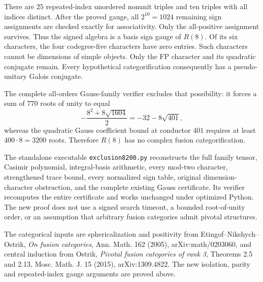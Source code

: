 There are $25$ repeated-index unordered nonunit triples and ten triples
with all indices distinct. After the proved gauge, all $2^{10}=1024$
remaining sign assignments are checked exactly for associativity. Only
the all-positive assignment survives. Thus the signed algebra is a basis
sign gauge of $R(8)$. Of its six characters, the four codegree-five
characters have zero entries. Such characters cannot be dimensions of
simple objects. Only the FP character and its quadratic conjugate remain.
Every hypothetical categorification consequently has a pseudo-unitary
Galois conjugate.

The complete all-orders Gauss-family verifier excludes that possibility:
it forces a sum of $770$ roots of unity to equal
\[
-\frac{8^2+8\sqrt{1604}}2=-32-8\sqrt{401},
\]
whereas the quadratic Gauss coefficient bound at conductor $401$ requires
at least $400\cdot8=3200$ roots. Therefore $R(8)$ has no complex fusion
categorification.

The standalone executable \texttt{exclusion8200.py} reconstructs the
full family tensor, Casimir polynomial, integral-basis arithmetic, every
mod-two character, strengthened trace bound, every normalized sign table,
original dimension-character obstruction, and the complete existing Gauss
certificate. Its verifier recomputes the entire certificate and works
unchanged under optimized Python. The new proof does not use a signed
search timeout, a bounded root-of-unity order, or an assumption that
arbitrary fusion categories admit pivotal structures.

The categorical inputs are sphericalization and positivity from
Etingof--Nikshych--Ostrik, \emph{On fusion categories},
Ann. Math. 162 (2005), arXiv:math/0203060, and central induction from
Ostrik, \emph{Pivotal fusion categories of rank 3}, Theorems 2.5 and 2.13,
Mosc. Math. J. 15 (2015), arXiv:1309.4822. The new isolation, parity and
repeated-index gauge arguments are proved above.
